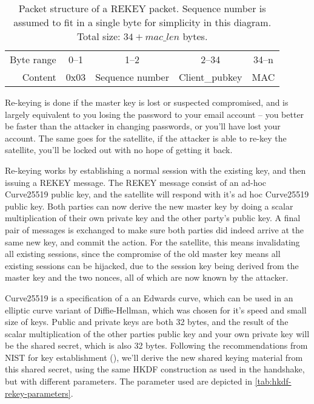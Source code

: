\begin{table}[ht!]
\centering
    \begin{tabular}{r | c | c | c | c |}
    \cline{2-5}
    Byte range & 0--1 & 1--2 & 2--34 & 34--n \\ \cline{2-5}
    Content & 0x03 & Sequence number & Client\_pubkey & MAC \\ \cline{2-5}
    \end{tabular}
    \caption{Packet structure of a REKEY packet. Sequence number is assumed to fit in a single byte for simplicity in this diagram. Total size: \( 34 + mac\_len \) bytes.}
\end{table}

Re-keying is done if the master key is lost or suspected compromised, and is largely equivalent to you losing the password to your email account -- you better be faster than the attacker in changing passwords, or you'll have lost your account. The same goes for the satellite, if the attacker is able to re-key the satellite, you'll be locked out with no hope of getting it back.

Re-keying works by establishing a normal session with the existing key, and then issuing a REKEY message. The REKEY message consist of an ad-hoc Curve25519 public key, and the satellite will respond with it's ad hoc Curve25519 public key. Both parties can now derive the new master key by doing a scalar multiplication of their own private key and the other party's public key. A final pair of messages is exchanged to make sure both parties did indeed arrive at the same new key, and commit the action. For the satellite, this means invalidating all existing sessions, since the compromise of the old master key means all existing sessions can be hijacked, due to the session key being derived from the master key and the two nonces, all of which are now known by the attacker.

Curve25519 is a specification of a an Edwards curve, which can be used in an elliptic curve variant of Diffie-Hellman, which was chosen for it's speed and small size of keys. Public and private keys are both 32 bytes, and the result of the scalar multiplication of the other parties public key and your own private key will be the shared secret, which is also 32 bytes. Following the recommendations from NIST for key establishment (\cite{sp800-56a}), we'll derive the new shared keying material from this shared secret, using the same HKDF construction as used in the handshake, but with different parameters. The parameter used are depicted in \autoref{tab:hkdf-rekey-parameters}.

